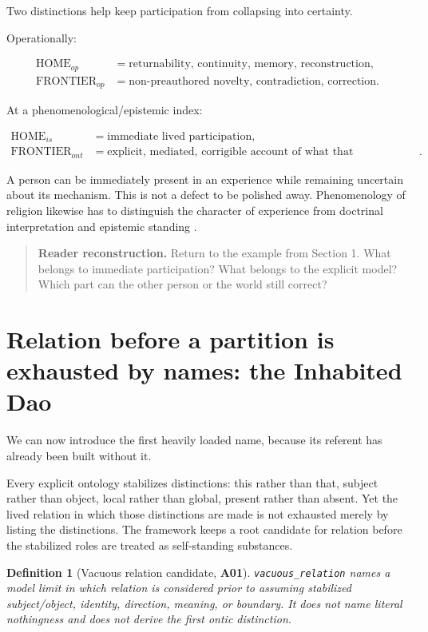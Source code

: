 \documentclass[11pt]{article}
\newtheorem{definition}{Definition}
\newcommand{\claim}[1]{\textsf{\textbf{#1}}}
\newenvironment{readercheck}{\begin{quote}\small\noindent\textbf{Reader reconstruction.}\;}{\end{quote}}
\begin{document}
Two distinctions help keep participation from collapsing into certainty.

Operationally:

\begin{align}
\mathrm{HOME}_{op} &= \text{returnability, continuity, memory, reconstruction},\\
\mathrm{FRONTIER}_{op} &= \text{non-preauthored novelty, contradiction, correction}.
\end{align}

At a phenomenological/epistemic index:

\begin{align}
\mathrm{HOME}_{is} &= \text{immediate lived participation},\\
\mathrm{FRONTIER}_{ont} &= \text{explicit, mediated, corrigible account of what that participation is}.
\end{align}

A person can be immediately present in an experience while remaining uncertain about its mechanism. This is not a defect to be polished away. Phenomenology of religion likewise has to distinguish the character of experience from doctrinal interpretation and epistemic standing \cite{SEPPhenomenologyReligion2024}.

\begin{readercheck}
Return to the example from Section 1. What belongs to immediate participation? What belongs to the explicit model? Which part can the other person or the world still correct?
\end{readercheck}

\section{Relation before a partition is exhausted by names: the Inhabited Dao}

We can now introduce the first heavily loaded name, because its referent has already been built without it.

Every explicit ontology stabilizes distinctions: this rather than that, subject rather than object, local rather than global, present rather than absent. Yet the lived relation in which those distinctions are made is not exhausted merely by listing the distinctions. The framework keeps a root candidate for relation before the stabilized roles are treated as self-standing substances.

\begin{definition}[Vacuous relation candidate, \claim{A01}]
\texttt{vacuous\_relation} names a model limit in which relation is considered prior to assuming stabilized subject/object, identity, direction, meaning, or boundary. It does not name literal nothingness and does not derive the first ontic distinction.
\end{definition}
\end{document}
